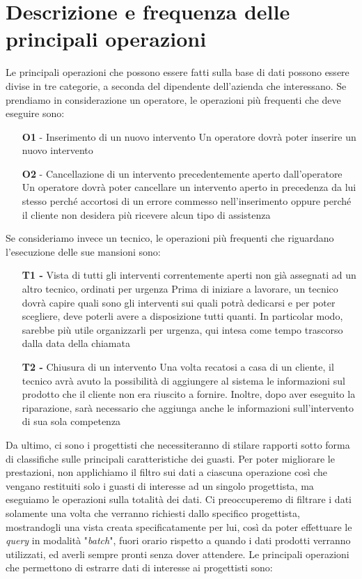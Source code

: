 \documentclass[a4paper, 12pt]{report}
\begin{document}
\section{Descrizione e frequenza delle principali operazioni}

Le principali operazioni che possono essere fatti sulla base di dati possono essere divise in tre categorie, a seconda del dipendente
dell'azienda che interessano. Se prendiamo in considerazione un operatore, le operazioni più frequenti che deve eseguire sono:

\begin{itemize}
	\item[\textbf{O1} -] Inserimento di un nuovo intervento
		\subitem Un operatore dovrà poter inserire un nuovo intervento 
	\item[\textbf{O2} -] Cancellazione di un intervento precedentemente aperto dall'operatore
		\subitem Un operatore dovrà poter cancellare un intervento aperto in precedenza da lui stesso perché accortosi di un errore commesso nell'inserimento
		oppure perché il cliente non desidera più ricevere alcun tipo di assistenza
\end{itemize}

Se consideriamo invece un tecnico, le operazioni più frequenti che riguardano l'esecuzione delle sue mansioni sono:

\begin{itemize}
	\item[\textbf{T1 -}] Vista di tutti gli interventi correntemente aperti non già assegnati ad un altro tecnico, ordinati per urgenza
		\subitem Prima di iniziare a lavorare, un tecnico dovrà capire quali sono gli interventi sui quali potrà dedicarsi e per poter scegliere, deve poterli avere a
		disposizione tutti quanti. In particolar modo, sarebbe più utile organizzarli per urgenza, qui intesa come tempo trascorso dalla data della chiamata
	\item[\textbf{T2 -}] Chiusura di un intervento
		\subitem Una volta recatosi a casa di un cliente, il tecnico avrà avuto la possibilità di aggiungere al sistema le informazioni sul prodotto che il cliente
		non era riuscito a fornire. Inoltre, dopo aver eseguito la riparazione, sarà necessario che aggiunga anche le informazioni sull'intervento di sua sola competenza
\end{itemize}

Da ultimo, ci sono i progettisti che necessiteranno di stilare rapporti sotto forma di classifiche sulle principali caratteristiche dei guasti. Per poter migliorare le prestazioni,
non applichiamo il filtro sui dati a ciascuna operazione così che vengano restituiti solo i guasti di interesse ad un singolo progettista, ma eseguiamo le operazioni sulla totalità
dei dati. Ci preoccuperemo di filtrare i dati solamente una volta che verranno richiesti dallo specifico progettista, mostrandogli una vista creata specificatamente per lui, così
da poter effettuare le \textit{query} in modalità "\textit{batch}", fuori orario rispetto a quando i dati prodotti verranno utilizzati, ed averli sempre pronti senza dover attendere.
Le principali operazioni che permettono di estrarre dati di interesse ai progettisti sono:
\end{document}
